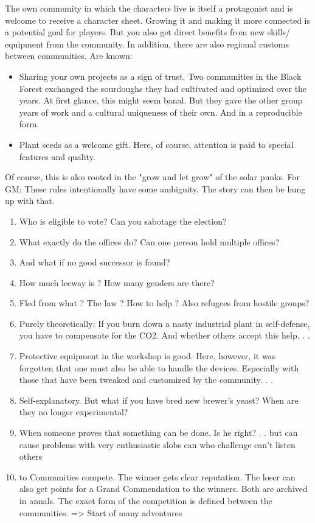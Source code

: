 The own community in which the characters live is itself a protagonist and is welcome to receive a character sheet. Growing it and making it more connected is a potential goal for players. But you also get direct benefits from new skills/ equipment from the community.
In addition, there are also regional customs between communities. Are known:
\begin{itemize}
    \item Sharing your own projects as a sign of trust. Two communities in the Black Forest exchanged the sourdoughs they had cultivated and optimized over the years. At first glance, this might seem banal. But they gave the other group years of work and a cultural uniqueness of their own. And in a reproducible form.
    \item Plant seeds as a welcome gift. Here, of course, attention is paid to special features and quality.
\end{itemize}
Of course, this is also rooted in the "grow and let grow" of the solar punks.
For GM: These rules intentionally have some ambiguity. The story can then be hung up with that.
\begin{enumerate}
    \item Who is eligible to vote? Can you sabotage the election?
    \item What exactly do the offices do? Can one person hold multiple offices?
    \item And what if no good successor is found?
    \item How much leeway is ? How many genders are there?
    \item Fled from what ? The law ? How to help ? Also refugees from hostile groups?
    \item Purely theoretically: If you burn down a nasty industrial plant in self-defense, you have to compensate for the CO2. And whether others accept this help. . .
    \item Protective equipment in the workshop is good. Here, however, it was forgotten that one must also be able to handle the devices. Especially with those that have been tweaked and customized by the community. . .
    \item  Self-explanatory. But what if you have bred new brewer's yeast? When are they no longer experimental?
    \item When someone proves that something can be done. Is he right? . . but can cause problems with very enthusiastic slobs can who challenge can't listen others
    \item to Communities compete. The winner gets clear reputation. The loser can also get points for a Grand Commendation to the winners. Both are archived in annals. The exact form of the competition is defined between the communities. => Start of many adventures
\end{enumerate}

